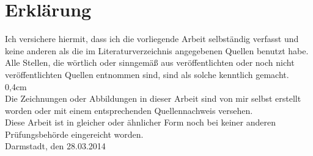 \section*{Erklärung}
\label{erklaerung}
		 
Ich versichere hiermit, dass ich die vorliegende Arbeit selbständig verfasst und
keine anderen als die im Literaturverzeichnis angegebenen Quellen benutzt habe.
\\
Alle Stellen, die wörtlich oder sinngemäß aus veröffentlichten oder noch nicht
veröffentlichten Quellen entnommen sind, sind als solche kenntlich gemacht. \zab
{0,4cm}\\
Die Zeichnungen oder Abbildungen in dieser Arbeit sind
von mir selbst erstellt worden oder mit einem entsprechenden Quellennachweis
versehen. \\
Diese Arbeit ist in gleicher oder ähnlicher Form noch bei keiner anderen
Prüfungsbehörde eingereicht worden. \zab {2cm}\\
Darmstadt, den 28.03.2014 \\
